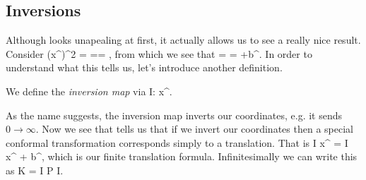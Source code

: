 \subsection{Inversions}

Although  looks unapealing at first, it actually allows us to see a really nice result. Consider 
\be
\label{eqn:xPrimedSquared}
    (x^\prime)^2 = == ,
\ee 
from which we see that 
\be
\label{eqn:xByxSquared}
     =  = +b^\mu. 
\ee 
In order to understand what this tells us, let's introduce another definition. 

    We define the \textit{inversion map} via 
    \be 
    \label{eqn:InversionMap}
        I: x^\mu \rightarrow {}.
    \ee 
\ed 

As the name suggests, the inversion map inverts our coordinates, e.g. it sends $0 \to \infty$. Now we see that  tells us that if we invert our coordinates then a special conformal transformation corresponds simply to a translation. That is 
\bse 
    I x^{\prime\mu} = I x^{\mu} + b^{\mu},
\ese
which is our finite translation formula. Infinitesimally we can write this as
\be
\label{eqn:KEqualIPI}
    K = I P I.
\ee 